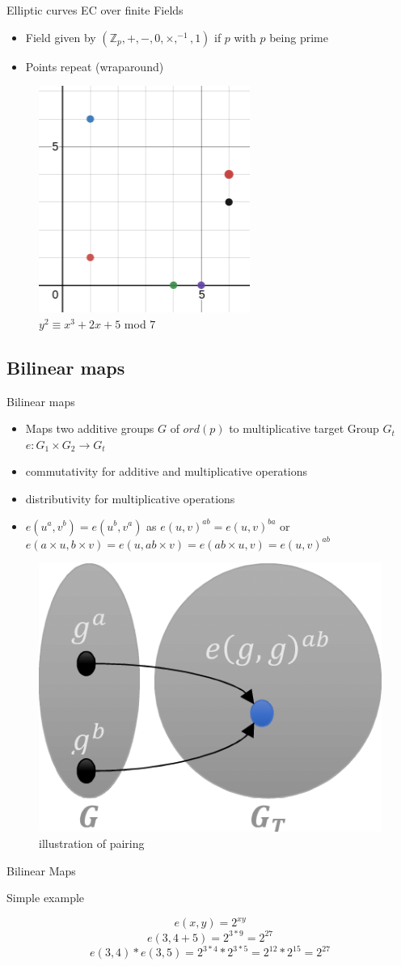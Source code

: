 \documentclass{beamer}
\begin{document}
\begin{frame}{Elliptic curves}
	EC over finite Fields
	\begin{itemize}
		\item Field given by $(\mathbb{Z}_p,+,-,0,\times,^{-1},1)$ if $p$ with $p$ being prime
		\item Points repeat (wraparound)
	\end{itemize}
	\begin{figure}[hbt!]
		\centering
		\includegraphics[width=0.4\linewidth]{ec3}
		\caption{$y^2 \equiv x^3 + 2x + 5$ mod $7$}
	\end{figure}
\end{frame}
\subsection{Bilinear maps}
\begin{frame}{Bilinear maps}
	\begin{itemize}
		\item Maps two additive groups $G$ of $ord(p)$ to multiplicative target Group $G_t$ $e: G_1 \times G_2 \rightarrow G_t$
		\item commutativity for additive and multiplicative operations
		\item distributivity for multiplicative operations
		\item $e(u^a,v^b) = e(u^b,v^a)$ as $e(u,v)^{ab} = e(u,v)^{ba}$ or $e(a\times{u},b\times{v}) = e(u,ab\times{v}) = e(ab\times{u},v) = e(u,v)^{ab}$
	\end{itemize}
	\begin{figure}[hbt!]
		\centering
		\includegraphics[width=0.25\linewidth]{pairing1}
		\caption{illustration of pairing}
	\end{figure}
\end{frame}
\begin{frame}{Bilinear Maps}
	\begin{center}
		Simple example
	\end{center}
	$$e(x, y) = 2^{xy}$$
	$$e(3, 4 + 5) = 2^{3*9} = 2^{27}$$
	$$e(3, 4) * e(3, 5) = 2^{3*4} * 2^{3*5} = 2^{12} * 2^{15} = 2^{27}$$
\end{frame}
\end{document}
